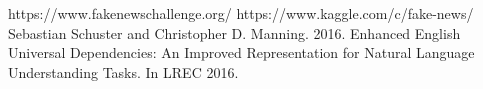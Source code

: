 \documentclass{article}
\begin{document}
		\begin{thebibliography}{9}
				https://www.fakenewschallenge.org/
				https://www.kaggle.com/c/fake-news/
				 Sebastian Schuster and Christopher D. Manning. 2016. Enhanced English Universal Dependencies: An Improved Representation for Natural Language Understanding Tasks. In LREC 2016. 
		\end{thebibliography}
\end{document}
